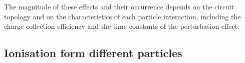 The magnitude of these effects and their occurrence depends on the circuit topology and on the characteristics of each particle interaction, including the charge collection efficiency and the time constants of the perturbation effect. 

\subsection{Ionisation form different particles}
\label{subsec:SEE with Heavy Ions}

\begin{figure}
    \centering
    \hspace{0.1cm}
    \hspace{0.1cm}

\end{figure}
